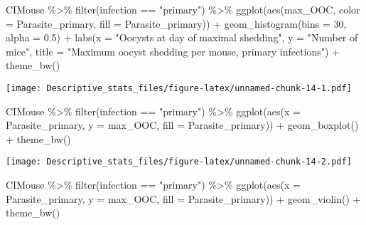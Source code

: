 \documentclass[
]{article}
\newenvironment{Shaded}{\begin{snugshade}}{\end{snugshade}}
\newcommand{\AttributeTok}[1]{\textcolor[rgb]{0.77,0.63,0.00}{#1}}
\newcommand{\DecValTok}[1]{\textcolor[rgb]{0.00,0.00,0.81}{#1}}
\newcommand{\FloatTok}[1]{\textcolor[rgb]{0.00,0.00,0.81}{#1}}
\newcommand{\FunctionTok}[1]{\textcolor[rgb]{0.00,0.00,0.00}{#1}}
\newcommand{\NormalTok}[1]{#1}
\newcommand{\SpecialCharTok}[1]{\textcolor[rgb]{0.00,0.00,0.00}{#1}}
\newcommand{\StringTok}[1]{\textcolor[rgb]{0.31,0.60,0.02}{#1}}
\begin{document}
\begin{Shaded}
\begin{Highlighting}[]
\NormalTok{CIMouse }\SpecialCharTok{\%\textgreater{}\%}
    \FunctionTok{filter}\NormalTok{(infection }\SpecialCharTok{==} \StringTok{"primary"}\NormalTok{)  }\SpecialCharTok{\%\textgreater{}\%}
  \FunctionTok{ggplot}\NormalTok{(}\FunctionTok{aes}\NormalTok{(max\_OOC, }\AttributeTok{color =}\NormalTok{ Parasite\_primary, }\AttributeTok{fill =}\NormalTok{ Parasite\_primary)) }\SpecialCharTok{+}
  \FunctionTok{geom\_histogram}\NormalTok{(}\AttributeTok{bins =} \DecValTok{30}\NormalTok{, }\AttributeTok{alpha =} \FloatTok{0.5}\NormalTok{) }\SpecialCharTok{+}
  \FunctionTok{labs}\NormalTok{(}\AttributeTok{x =} \StringTok{"Oocysts at day of maximal shedding"}\NormalTok{, }\AttributeTok{y =} \StringTok{"Number of mice"}\NormalTok{,}
       \AttributeTok{title =} \StringTok{"Maximum oocyst shedding per mouse, primary infections"}\NormalTok{) }\SpecialCharTok{+}
    \FunctionTok{theme\_bw}\NormalTok{()}
\end{Highlighting}
\end{Shaded}

\texttt{[image: Descriptive\_stats\_files/figure-latex/unnamed-chunk-14-1.pdf]}

\begin{Shaded}
\begin{Highlighting}[]
\NormalTok{CIMouse  }\SpecialCharTok{\%\textgreater{}\%}
    \FunctionTok{filter}\NormalTok{(infection }\SpecialCharTok{==} \StringTok{"primary"}\NormalTok{)  }\SpecialCharTok{\%\textgreater{}\%}
  \FunctionTok{ggplot}\NormalTok{(}\FunctionTok{aes}\NormalTok{(}\AttributeTok{x =}\NormalTok{ Parasite\_primary, }\AttributeTok{y =}\NormalTok{ max\_OOC, }\AttributeTok{fill =}\NormalTok{ Parasite\_primary)) }\SpecialCharTok{+}
  \FunctionTok{geom\_boxplot}\NormalTok{() }\SpecialCharTok{+}
    \FunctionTok{theme\_bw}\NormalTok{()}
\end{Highlighting}
\end{Shaded}

\texttt{[image: Descriptive\_stats\_files/figure-latex/unnamed-chunk-14-2.pdf]}

\begin{Shaded}
\begin{Highlighting}[]
\NormalTok{CIMouse  }\SpecialCharTok{\%\textgreater{}\%}
    \FunctionTok{filter}\NormalTok{(infection }\SpecialCharTok{==} \StringTok{"primary"}\NormalTok{)  }\SpecialCharTok{\%\textgreater{}\%}
  \FunctionTok{ggplot}\NormalTok{(}\FunctionTok{aes}\NormalTok{(}\AttributeTok{x =}\NormalTok{ Parasite\_primary, }\AttributeTok{y =}\NormalTok{ max\_OOC, }\AttributeTok{fill =}\NormalTok{ Parasite\_primary)) }\SpecialCharTok{+}
  \FunctionTok{geom\_violin}\NormalTok{() }\SpecialCharTok{+}
    \FunctionTok{theme\_bw}\NormalTok{() }
\end{Highlighting}
\end{Shaded}
\end{document}
